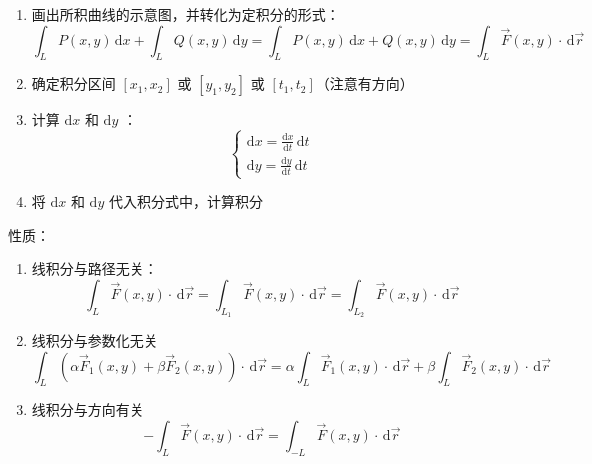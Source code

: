 \begin{enumerate}
    \item 画出所积曲线的示意图，并转化为定积分的形式：
          \[
              \int_{L} P(x,y) \, \mathrm{d}x + \int_{L} Q(x,y) \, \mathrm{d}y = \int_{L} P(x,y) \, \mathrm{d}x + Q(x,y) \, \mathrm{d}y = \int_{L} \vec{F}(x,y) \cdot \, \mathrm{d}\vec{r}
          \]
    \item 确定积分区间 $[x_1,x_2]$ 或 $[y_1,y_2]$ 或 $[t_1,t_2]$（注意有方向）
    \item 计算 $\mathrm{d}x$ 和 $\mathrm{d}y$ ：
          \[
              \begin{cases}
                  \mathrm{d}x = \frac{\mathrm{d}x}{\mathrm{d}t} \, \mathrm{d}t \\
                  \mathrm{d}y = \frac{\mathrm{d}y}{\mathrm{d}t} \, \mathrm{d}t
              \end{cases}
          \]
    \item 将 $\mathrm{d}x$ 和 $\mathrm{d}y$ 代入积分式中，计算积分
\end{enumerate}

性质：

\begin{enumerate}
    \item 线积分与路径无关：
          \[
              \int_{L} \vec{F}(x,y) \cdot \, \mathrm{d}\vec{r} = \int_{L_1} \vec{F}(x,y) \cdot \, \mathrm{d}\vec{r} = \int_{L_2} \vec{F}(x,y) \cdot \, \mathrm{d}\vec{r}
          \]
    \item 线积分与参数化无关
          \[
              \int_{L} (\alpha \vec{F}_1 (x,y) + \beta \vec{F}_2 (x,y)) \cdot \, \mathrm{d}\vec{r} = \alpha \int_{L} \vec{F}_1 (x,y) \cdot \, \mathrm{d}\vec{r} + \beta \int_{L} \vec{F}_2 (x,y) \cdot \, \mathrm{d}\vec{r}
          \]
    \item 线积分与方向有关
          \[
              -\int_{L} \vec{F}(x,y) \cdot \, \mathrm{d}\vec{r} = \int_{-L} \vec{F}(x,y) \cdot \, \mathrm{d}\vec{r}
          \]
\end{enumerate}
